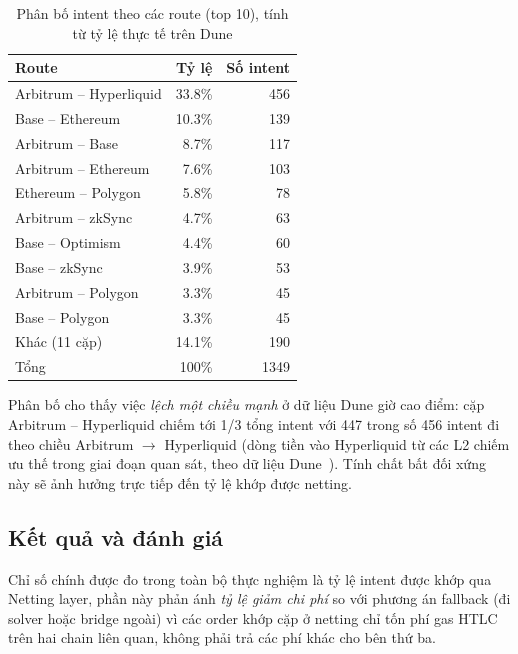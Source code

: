 \begin{table}[H]
    \centering
    \caption{Phân bố intent theo các route (top 10), tính từ tỷ lệ thực tế trên Dune}
    \label{tab:c4-route-distribution}
    \begin{tabular}{|l|r|r|}
        \hline
        \textbf{Route} & \textbf{Tỷ lệ} & \textbf{Số intent} \\
        \hline
        Arbitrum -- Hyperliquid & 33.8\% & 456 \\
        \hline
        Base -- Ethereum & 10.3\% & 139 \\
        \hline
        Arbitrum -- Base & 8.7\% & 117 \\
        \hline
        Arbitrum -- Ethereum & 7.6\% & 103 \\
        \hline
        Ethereum -- Polygon & 5.8\% & 78 \\
        \hline
        Arbitrum -- zkSync & 4.7\% & 63 \\
        \hline
        Base -- Optimism & 4.4\% & 60 \\
        \hline
        Base -- zkSync & 3.9\% & 53 \\
        \hline
        Arbitrum -- Polygon & 3.3\% & 45 \\
        \hline
        Base -- Polygon & 3.3\% & 45 \\
        \hline
        Khác (11 cặp) & 14.1\% & 190 \\
        \hline
        Tổng & 100\% & 1349 \\
        \hline
    \end{tabular}
\end{table}

Phân bố cho thấy việc \emph{lệch một chiều mạnh} ở dữ liệu Dune giờ
cao điểm: cặp Arbitrum -- Hyperliquid chiếm tới 1/3 tổng
intent với 447 trong số 456 intent đi theo chiều Arbitrum $\rightarrow$ Hyperliquid
(dòng tiền vào Hyperliquid từ các L2 chiếm ưu thế trong giai đoạn quan sát, theo dữ liệu Dune~\cite{dune_bridges_dataset}). Tính
chất bất đối xứng này sẽ ảnh hưởng trực tiếp đến tỷ lệ khớp được netting.

\subsection{Kết quả và đánh giá}

Chỉ số chính được đo trong toàn bộ thực nghiệm là tỷ lệ intent được khớp qua
Netting layer, phần này phản ánh \emph{tỷ lệ giảm chi phí} so với phương án
fallback (đi solver hoặc bridge ngoài) vì các order khớp cặp ở netting chỉ tốn phí gas
HTLC trên hai chain liên quan, không phải trả các phí khác cho bên thứ ba.

